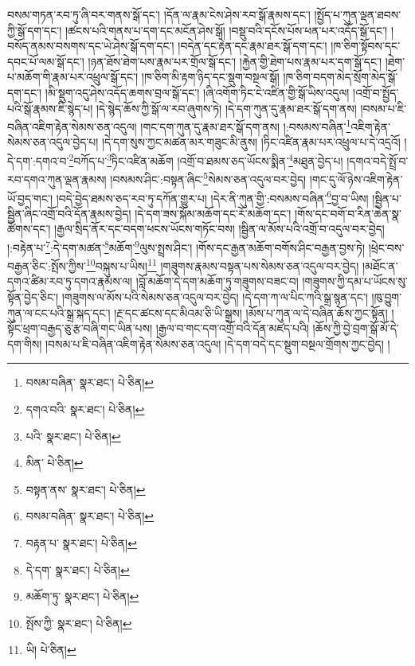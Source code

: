 བསམ་གཏན་རབ་ཏུ་ཞི་བར་གནས་སྒོ་དང་། །དོན་ལ་རྣམ་ངེས་ཤེས་རབ་སྒོ་རྣམས་དང་། །སྤྱོད་པ་ཀུན་ལྡན་ཐབས་ཀྱི་སྒོ་དག་དང་། །ཚངས་པའི་གནས་པ་དག་དང་མངོན་ཤེས་སྒོ། །བསྡུ་བའི་དངོས་པོས་ཕན་པར་འདོད་སྒོ་དང་། །བསོད་ནམས་བསགས་དང་ཡེ་ཤེས་སྒོ་དག་དང་། །བདེན་དང་རྟེན་དང་རྣམ་ཐར་སྒོ་དག་དང་། །ཁ་ཅིག་སྟོབས་དང་དབང་པོ་ལམ་སྒོ་དང་། །ཉན་ཐོས་ཐེག་པས་རྣམ་པར་གྲོལ་སྒོ་དང་། །རྐྱེན་གྱི་ཐེག་པས་རྣམ་པར་དག་སྒོ་དང་། །ཐེག་པ་མཆོག་གི་རྣམ་པར་འཕྲུལ་སྒོ་དང་། །ཁ་ཅིག་མི་རྟག་ཉིད་དང་སྡུག་བསྔལ་སྒོ། །ཁ་ཅིག་བདག་མེད་སྲོག་མེད་སྒོ་དག་དང་། །མི་སྡུག་འདུ་ཤེས་འདོད་ཆགས་བྲལ་སྒོ་དང་། །ཞི་འགོག་ཏིང་ངེ་འཛིན་གྱི་སྒོ་ཡིས་འདུལ། །འགྲོ་བ་སྤྱོད་པའི་སྒོ་རྣམས་ཇི་སྙེད་པ། །དེ་སྙེད་ཆོས་ཀྱི་སྒོ་ལ་རབ་ཞུགས་ཏེ། །དེ་དག་ཀུན་དུ་རྣམ་ཐར་སྒོ་དག་ནས། །བསམ་པ་ཇི་བཞིན་འཇིག་རྟེན་སེམས་ཅན་འདུལ། །གང་དག་ཀུན་དུ་རྣམ་ཐར་སྒོ་དག་ནས། །:བསམས་བཞིན་\footnote{བསམ་བཞིན་  སྣར་ཐང་།  པེ་ཅིན། }འཇིག་རྟེན་སེམས་ཅན་འདུལ་བྱེད་པ། །དེ་དག་སུས་ཀྱང་མཚན་མར་གཟུང་མི་ནུས། །ཏིང་འཛིན་རྣམ་པར་འཕྲུལ་པ་དེ་འདྲའོ། །དེ་དག་:དགའ་བ་\footnote{དགའ་བའི་  སྣར་ཐང་།  པེ་ཅིན། }བཀོད་པ་\footnote{པའི་  སྣར་ཐང་།  པེ་ཅིན། }ཏིང་འཛིན་མཆོག །འགྲོ་བ་ཐམས་ཅད་ཡོངས་སྨིན་\footnote{མིན་  པེ་ཅིན། }མཐུན་བྱེད་པ། །དགའ་བདེ་སྤྲོ་བ་རབ་དགའ་ཀུན་ལྡན་རྣམས། །བསམས་ཤིང་:བསྟན་ཞིང་\footnote{བསྟན་ནས་  སྣར་ཐང་།  པེ་ཅིན། }སེམས་ཅན་འདུལ་བར་བྱེད། །གང་དུ་ལོ་ཉེས་འཇིག་རྟེན་ཡོ་བྱད་གང་། །བདེ་བྱེད་ཐམས་ཅད་རབ་ཏུ་དཀོན་གྱུར་པ། །དེར་ནི་ཀུན་གྱི་:བསམས་བཞིན་\footnote{བསམ་བཞིན་  སྣར་ཐང་།  པེ་ཅིན། }བྱ་བ་ཡིས། །སྦྱིན་པ་སྦྱིན་ཞིང་འགྲོ་བའི་དོན་རྣམས་བྱེད། །དེ་དག་ཟས་སྐོམ་མཆོག་དང་རོ་མཆོག་དང་། །གོས་དང་བགོ་བ་རིན་ཆེན་སྣ་ཚོགས་དང་། །རྒྱལ་སྲིད་ནོར་དང་བདག་ཕངས་ཡོངས་གཏོང་བས། །སྦྱིན་ལ་མོས་པའི་འགྲོ་བ་འདུལ་བར་བྱེད། །:བརྟེན་པ་\footnote{བརྟན་པ་  སྣར་ཐང་།  པེ་ཅིན། }:དེ་དག་མཚན་\footnote{དེ་དག་  སྣར་ཐང་།  པེ་ཅིན། }མཆོག་\footnote{མཆོག་ཏུ་  སྣར་ཐང་།  པེ་ཅིན། }ལུས་སྤྲས་ཤིང་། །གོས་དང་རྒྱན་མཆོག་བགོས་ཤིང་བརྒྱན་བྱས་ཏེ། །ཕྲེང་བས་བརྒྱན་ཅིང་:སྤོས་ཀྱིས་\footnote{སྤོས་ཀྱི་  སྣར་ཐང་།  པེ་ཅིན། }བསྐུས་པ་ཡིས།\footnote{ཡི།  པེ་ཅིན། } །གཟུགས་རྣམས་བསྟན་པས་སེམས་ཅན་འདུལ་བར་བྱེད། །མཐོང་ན་དགའ་ཚིམ་རབ་ཏུ་དགའ་རྣམས་ལ། །བློ་མཆོག་དེ་དག་མཆོག་ཏུ་གཟུགས་བཟང་བ། །གཟུགས་ཀྱི་དམ་པ་ཡོངས་སུ་སྟོན་བྱེད་ཅིང་། །གཟུགས་ལ་མོས་པའི་སེམས་ཅན་འདུལ་བར་བྱེད། །དེ་དག་ཀ་ལ་པིང་ཀའི་སྒྲ་སྙན་དང་། །ཁུ་བྱུག་ཀུན་ལ་ངང་པའི་སྒྲ་སྐད་དང་། །རྔ་དང་ཚངས་དང་མིའམ་ཅི་ཡི་སྒྲས། །མོས་པ་ཀུན་ལ་དེ་བཞིན་ཆོས་ཀྱང་སྟོན། །སྟོང་ཕྲག་བརྒྱད་ཅུ་རྩ་བཞི་གང་ཡིན་པས། །རྒྱལ་བ་གང་དག་འགྲོ་བའི་དོན་མཛད་པའི། །ཆོས་ཀྱི་བྱེ་བྲག་སྒོ་མོ་དེ་དག་གིས། །བསམ་པ་ཇི་བཞིན་འཇིག་རྟེན་སེམས་ཅན་འདུལ། །དེ་དག་བདེ་དང་སྡུག་བསྔལ་གྲོགས་ཀྱང་བྱེད། །
